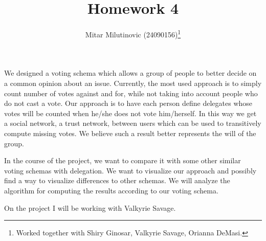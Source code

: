 \documentclass[a4paper,11pt,oneside,onecolumn]{article}
\title{Homework 4}
\author{Mitar Milutinovic (24090156)\thanks{Worked together with Shiry Ginosar, Valkyrie Savage, Orianna DeMasi.}}
\begin{document}
\maketitle

\section{}

\section{}

\section{}

\section{}

\section{}

We designed a voting schema which allows a group of people to better decide on a common opinion about an issue. Currently,
the most used approach is to simply count number of votes against and for, while not taking into account people who do
not cast a vote. Our approach is to have each person define delegates whose votes will be counted when he/she does not
vote him/herself. In this way we get a social network, a trust network, between users which can be
used to transitively compute missing votes. We believe such a result better represents the will of the group.

In the course of the project, we want to compare it with some other similar voting schemas with delegation. We want to visualize
our approach and possibly find a way to visualize differences to other schemas. We will analyze the algorithm for computing the
results according to our voting schema.

On the project I will be working with Valkyrie Savage.
\end{document}
